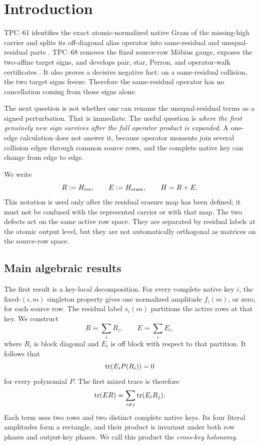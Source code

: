 \section{Introduction}
\label{sec:introduction}

TPC--61 identifies the exact atomic-normalized native Gram of the
missing-high carrier and splits its off-diagonal alias operator into
same-residual and unequal-residual parts \citep{WangTPC61}.  TPC--68 removes
the fixed source-row Möbius gauge, exposes the two-affine target signs, and
develops pair, star, Perron, and operator-walk certificates
\citep{WangTPC68}.  It also proves a decisive negative fact: on a
same-residual collision, the two target signs freeze.  Therefore the
same-residual operator has no cancellation coming from those signs alone.

The next question is not whether one can rename the unequal-residual terms
as a signed perturbation.  That is immediate.  The useful question is
\emph{where the first genuinely new sign survives after the full operator
product is expanded}.  A one-edge calculation does not answer it, because
operator moments join several collision edges through common source rows,
and the complete native key can change from edge to edge.

We write
\[
 R:=H_{\rm res},\qquad E:=H_{\rm erase},\qquad H=R+E.
\]
This notation is used only after the residual erasure map has been defined;
it must not be confused with the represented carrier or with that map.
The two defects act on the same active row space.  They are separated by
residual labels at the atomic output level, but they are not automatically
orthogonal as matrices on the source-row space.

\subsection{Main algebraic results}

The first result is a key-local decomposition.  For every complete native
key \(i\), the fixed-\((i,m)\) singleton property gives one normalized
amplitude \(f_i(m)\), or zero, for each source row.  The residual label
\(s_i(m)\) partitions the active rows at that key.  We construct
\[
 R=\sum_iR_i,\qquad E=\sum_iE_i,
\]
where \(R_i\) is block diagonal and \(E_i\) is off block with respect to
that partition.  It follows that
\[
 \operatorname{tr}(E_iP(R_i))=0
\]
for every polynomial \(P\).  The first mixed trace is therefore
\[
 \operatorname{tr}(ER)=\sum_{i\ne j}\operatorname{tr}(E_iR_j).
\]
Each term uses two rows and two distinct complete native keys.  Its four
literal amplitudes form a rectangle, and their product is invariant under
both row phases and output-key phases.  We call this product the
\emph{cross-key holonomy}.

